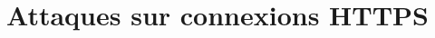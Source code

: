 \documentclass[a4paper,12pt]{memoir}
\title{Attaques sur connexions HTTPS}
\begin{document}
\maketitle

\newpage

\tableofcontents*

\newpage
















\end{document}
